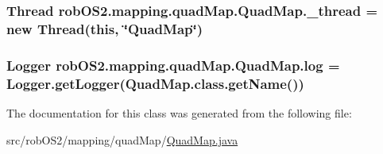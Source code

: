 \label{classrob_o_s2_1_1mapping_1_1quad_map_1_1_quad_map_a944ce3b32759689afbafe7c58737e852}
\hypertarget{classrob_o_s2_1_1mapping_1_1quad_map_1_1_quad_map_a077771c6c78e2c1419df398b50aa4c81}{
\subsubsection[{\_\-thread}]{\setlength{\rightskip}{0pt plus 5cm}Thread {\bf robOS2.mapping.quadMap.QuadMap.\_\-thread} = new Thread(this, \char`\"{}QuadMap\char`\"{})}}
\label{classrob_o_s2_1_1mapping_1_1quad_map_1_1_quad_map_a077771c6c78e2c1419df398b50aa4c81}
\hypertarget{classrob_o_s2_1_1mapping_1_1quad_map_1_1_quad_map_ac4c01d1f732a042fdfde54e6aa1358f3}{
\subsubsection[{log}]{\setlength{\rightskip}{0pt plus 5cm}Logger {\bf robOS2.mapping.quadMap.QuadMap.log} = Logger.getLogger(QuadMap.class.getName())}}
\label{classrob_o_s2_1_1mapping_1_1quad_map_1_1_quad_map_ac4c01d1f732a042fdfde54e6aa1358f3}


The documentation for this class was generated from the following file:\begin{DoxyCompactItemize}
\item 
src/robOS2/mapping/quadMap/\hyperlink{_quad_map_8java}{QuadMap.java}\end{DoxyCompactItemize}
